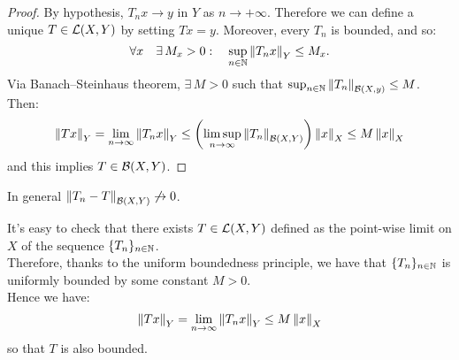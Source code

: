 \begin{proof}
	By hypothesis, $T_n x \to y$ in $Y$ as $n \to +\infty$. Therefore we can define a unique $T\in \mathcal L(X,Y)$ by setting $Tx=y$. Moreover, every $T_n$ is bounded, and so:
	$$
	\forall x \quad \exists \, M_x>0: \quad
	\sup_{n\in\mathbb N}\left\lVert T_nx \right\rVert_Y \leq M_x.
	$$
	Via Banach--Steinhaus theorem, $\exists \, M > 0$ such that $\sup_{n \in \mathbb N} \left\lVert T_n\right\rVert_{\mathcal B(X,y)}\leq M$. Then:
	$$\left\lVert Tx\right\rVert_Y = \lim_{n \to \infty}\left\lVert T_n x\right\rVert_Y \leq \left( \limsup_{n\to \infty} \left\lVert T_n\right\rVert_{\mathcal B(X,Y)}\right) \left\lVert x\right\rVert_X \leq M \left\lVert x\right\rVert_X $$
	and this implies $T \in \mathcal B(X,Y)$.
\end{proof}

In general $\left\lVert T_n - T\right\rVert_{\mathcal B(X,Y)} \not\to 0$.

It's easy to check that there exists $T \in \mathcal L(X,Y)$ defined as the point-wise limit on $X$ of the sequence $\{T_n\}_{n \in \mathbb N}$.\\
Therefore, thanks to the uniform boundedness principle, we have that $\{T_n\}_{n \in \mathbb N}$ is uniformly bounded by some constant $M>0$.\\
Hence we have:
$$
	\left\lVert Tx\right\rVert_Y
	= \lim\limits_{n \to \infty} \left\lVert T_nx\right\rVert_{Y}
	\leq M \left\lVert x\right\rVert_X
$$
so that $T$ is also bounded.
